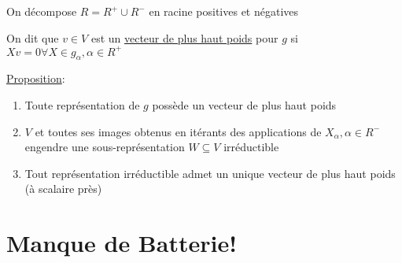On décompose \(R = R^{+} \cup R^{-}\) en racine positives et négatives 

On dit que \(v \in V\) est un \underline{vecteur de plus haut poids} pour \(g\) si \(Xv = 0 \forall X \in g_{\alpha}, \alpha \in R^{+}\) 

\underline{Proposition}: 


\begin{enumerate}[label=(\roman*)]
	\item Toute représentation de \(g\) possède un vecteur de plus haut poids 
	\item \(V\) et toutes ses images obtenus en itérants des applications de \(X_{\alpha} , \alpha \in R^{-}\) engendre une sous-représentation \(W \subseteq V\) irréductible 
	\item Tout représentation irréductible admet un unique vecteur de plus haut poids (à scalaire près)
\end{enumerate}

\section*{Manque de Batterie!}



